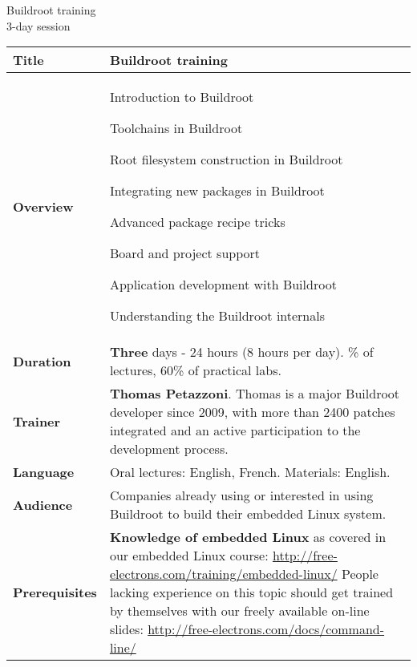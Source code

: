 \documentclass[a4paper,12pt,obeyspaces,spaces,hyphens]{article}
\begin{document}
\thispagestyle{fancy}

\setlength{\arrayrulewidth}{0.8pt}

\begin{center}
\LARGE
Buildroot training\\
\large
3-day session
\end{center}
\vspace{1cm}

\small
{}

 {
  \begin{tabularx}{\textwidth}{|g|h|}
    {\bf Title} & {\bf Buildroot training} \\
    \hline

    {\bf Overview} &
    Introduction to Buildroot \par
    Toolchains in Buildroot \par
    Root filesystem construction in Buildroot \par
    Integrating new packages in Buildroot \par
    Advanced package recipe tricks \par
    Board and project support \par
    Application development with Buildroot \par
    Understanding the Buildroot internals \\
    \hline

    {\bf Duration} & {\bf Three} days - 24 hours (8 hours per day).
    \% of lectures, 60\% of practical labs. \\
    \hline

    {\bf Trainer} & {\bf Thomas Petazzoni}. Thomas is a major
    Buildroot developer since 2009, with more than 2400 patches
    integrated and an active participation to the development process.\\
    \hline

    {\bf Language} & Oral lectures: English, French.
    \newline Materials: English.\\
    \hline

    {\bf Audience} & Companies already using or interested in using
    Buildroot to build their embedded Linux system.\\
    \hline

    {\bf Prerequisites} & {\bf Knowledge of embedded Linux} as covered
    in our embedded Linux course:
    \newline \url{http://free-electrons.com/training/embedded-linux/} \vspace{1em}
    \newline People lacking experience on this topic should get
    trained by themselves with our freely available on-line slides:
    \newline \url{http://free-electrons.com/docs/command-line/} \\
    \hline
  \end{tabularx}

}
\end{document}
